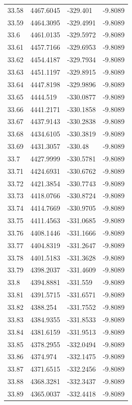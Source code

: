 \begin{table}[H]
\begin{tabular}{llll}
33.58 & 4467.6045 & -329.401 & -9.8089 \\
33.59 & 4464.3095 & -329.4991 & -9.8089 \\
33.6 & 4461.0135 & -329.5972 & -9.8089 \\
33.61 & 4457.7166 & -329.6953 & -9.8089 \\
33.62 & 4454.4187 & -329.7934 & -9.8089 \\
33.63 & 4451.1197 & -329.8915 & -9.8089 \\
33.64 & 4447.8198 & -329.9896 & -9.8089 \\
33.65 & 4444.519 & -330.0877 & -9.8089 \\
33.66 & 4441.2171 & -330.1858 & -9.8089 \\
33.67 & 4437.9143 & -330.2838 & -9.8089 \\
33.68 & 4434.6105 & -330.3819 & -9.8089 \\
33.69 & 4431.3057 & -330.48 & -9.8089 \\
33.7 & 4427.9999 & -330.5781 & -9.8089 \\
33.71 & 4424.6931 & -330.6762 & -9.8089 \\
33.72 & 4421.3854 & -330.7743 & -9.8089 \\
33.73 & 4418.0766 & -330.8724 & -9.8089 \\
33.74 & 4414.7669 & -330.9705 & -9.8089 \\
33.75 & 4411.4563 & -331.0685 & -9.8089 \\
33.76 & 4408.1446 & -331.1666 & -9.8089 \\
33.77 & 4404.8319 & -331.2647 & -9.8089 \\
33.78 & 4401.5183 & -331.3628 & -9.8089 \\
33.79 & 4398.2037 & -331.4609 & -9.8089 \\
33.8 & 4394.8881 & -331.559 & -9.8089 \\
33.81 & 4391.5715 & -331.6571 & -9.8089 \\
33.82 & 4388.254 & -331.7552 & -9.8089 \\
33.83 & 4384.9355 & -331.8533 & -9.8089 \\
33.84 & 4381.6159 & -331.9513 & -9.8089 \\
33.85 & 4378.2955 & -332.0494 & -9.8089 \\
33.86 & 4374.974 & -332.1475 & -9.8089 \\
33.87 & 4371.6515 & -332.2456 & -9.8089 \\
33.88 & 4368.3281 & -332.3437 & -9.8089 \\
33.89 & 4365.0037 & -332.4418 & -9.8089 \\

\end{tabular}
\end{table}
